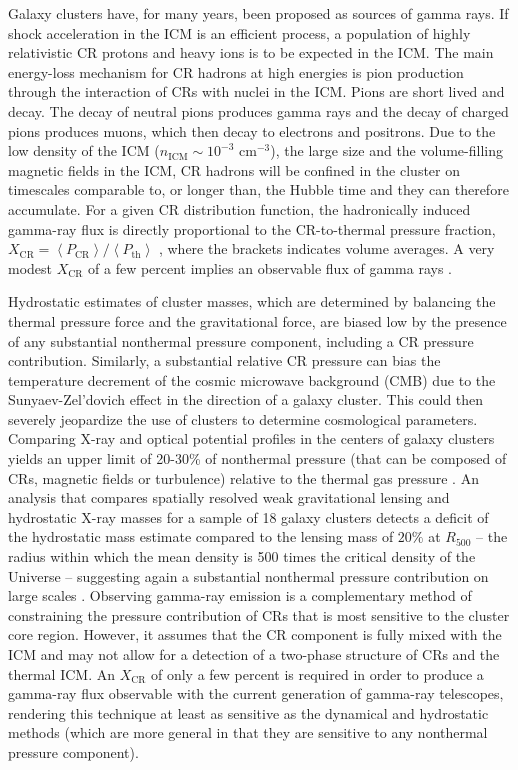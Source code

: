 \documentclass[12pt,manuscript]{aastex}
\newcommand{\expval}[1]{\left\langle #1 \right\rangle}
\newcommand{\CR}{\mathrm{CR}}
\begin{document}
Galaxy clusters have, for many years, been proposed as sources of gamma rays. If shock acceleration
in the ICM is an efficient process, a population of highly relativistic CR protons and heavy ions is
to be expected in the ICM. The main energy-loss mechanism for CR hadrons at high energies is pion
production through the interaction of CRs with nuclei in the ICM. Pions are short lived and decay.
The decay of neutral pions produces gamma rays and the decay of charged pions produces muons, which 
then decay to electrons and positrons. Due to the low density of the ICM
($n_{\mathrm{ICM}}\sim 10^{-3}$ cm$^{-3}$), the large size and the volume-filling magnetic fields in
the ICM, CR hadrons will be confined in the cluster on timescales comparable to, or longer than,
the Hubble time \citep[][]{article:Volk_etal:1996, article:Berezinsky_etal:1997} and they can
therefore accumulate. For a given CR distribution function, the hadronically induced gamma-ray
flux is directly proportional to the CR-to-thermal pressure fraction,
$X_\CR=\expval{P_{\CR}}/ \expval{P_{\mathrm{th}}}$ \citep[see, e.g.,][]{article:Ensslin_etal:2007},
where the brackets indicates volume averages. A very modest $X_{\CR}$ of a few percent implies an
observable flux of gamma rays \citep[e.g.,][]{article:PfrommerEnsslin:2004b}.

Hydrostatic estimates of cluster masses, which are determined by balancing the thermal pressure
force and the gravitational force, are biased low by the presence of any substantial nonthermal
pressure component, including a CR pressure contribution. Similarly, a substantial relative CR
pressure can bias the temperature decrement of the cosmic microwave background (CMB) due to the
Sunyaev-Zel'dovich effect in the direction of a galaxy cluster. This could then severely
jeopardize the use of clusters to determine cosmological parameters. Comparing X-ray and optical
potential profiles in the centers of galaxy clusters yields an upper limit of 20-30\% of nonthermal
pressure (that can be composed of CRs, magnetic fields or turbulence) relative to the thermal gas
pressure \citep{article:Churazov_etal:2008, article:Churazov_etal:2010}. An analysis that compares
spatially resolved weak gravitational lensing and hydrostatic X-ray masses for a sample of 18 galaxy
clusters detects a deficit of the hydrostatic mass estimate compared to the lensing mass of $20\%$
at $R_{500}$ -- the radius within which the mean density is 500 times the critical density of the
Universe -- suggesting again a substantial nonthermal pressure contribution on large scales
\citep{article:Mahdavi_etal:2008}. Observing gamma-ray emission is a complementary method of
constraining the pressure contribution of CRs that is most sensitive to the cluster core
region. However, it assumes that the CR component is fully mixed with the ICM and may not allow for
a detection of a two-phase structure of CRs and the thermal ICM. An $X_\CR$ of only a few percent is
required in order to produce a gamma-ray flux observable with the current generation of gamma-ray
telescopes, rendering this technique at least as sensitive as the dynamical and hydrostatic methods
(which are more general in that they are sensitive to any nonthermal pressure component).
\end{document}
